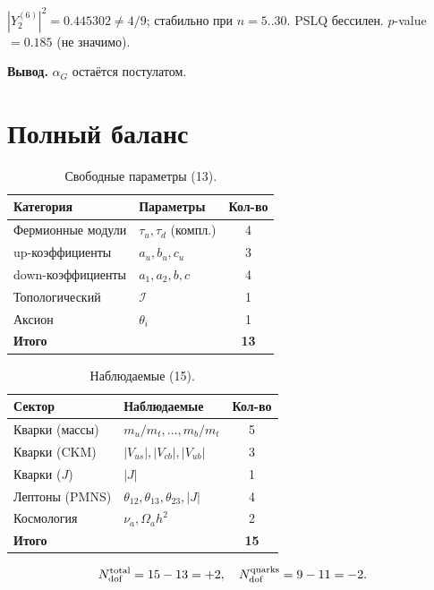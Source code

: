 \documentclass[12pt,a4paper]{article}
\numberwithin{equation}{section}
\begin{document}
$|Y^{(6)}_2|^2 = 0.445302 \neq 4/9$; стабильно при $n = 5..30$.
PSLQ бессилен. $p$-value $= 0.185$ (не значимо).

\textbf{Вывод.} $\alpha_G$ остаётся постулатом.

\section{Полный баланс}
\label{sec:balance}

\begin{table}[H]
\centering
\caption{Свободные параметры (13).}
\begin{tabular}{llc}
\toprule
Категория & Параметры & Кол-во \\
\midrule
Фермионные модули & $\tau_u, \tau_d$ (компл.) & 4 \\
up-коэффициенты & $a_u, b_u, c_u$ & 3 \\
down-коэффициенты & $a_1, a_2, b, c$ & 4 \\
Топологический & $\mathcal{I}$ & 1 \\
Аксион & $\theta_i$ & 1 \\
\midrule
\textbf{Итого} & & \textbf{13} \\
\bottomrule
\end{tabular}
\end{table}

\begin{table}[H]
\centering
\caption{Наблюдаемые (15).}
\begin{tabular}{llc}
\toprule
Сектор & Наблюдаемые & Кол-во \\
\midrule
Кварки (массы) & $m_u/m_t, \ldots, m_b/m_t$ & 5 \\
Кварки (CKM) & $|V_{us}|, |V_{cb}|, |V_{ub}|$ & 3 \\
Кварки ($J$) & $|J|$ & 1 \\
Лептоны (PMNS) & $\theta_{12}, \theta_{13}, \theta_{23}, |J|$ & 4 \\
Космология & $\nu_a, \Omega_a h^2$ & 2 \\
\midrule
\textbf{Итого} & & \textbf{15} \\
\bottomrule
\end{tabular}
\end{table}

\begin{equation}
N_{\rm dof}^{\rm total} = 15 - 13 = +2, \quad
N_{\rm dof}^{\rm quarks} = 9 - 11 = -2.
\end{equation}
\end{document}
